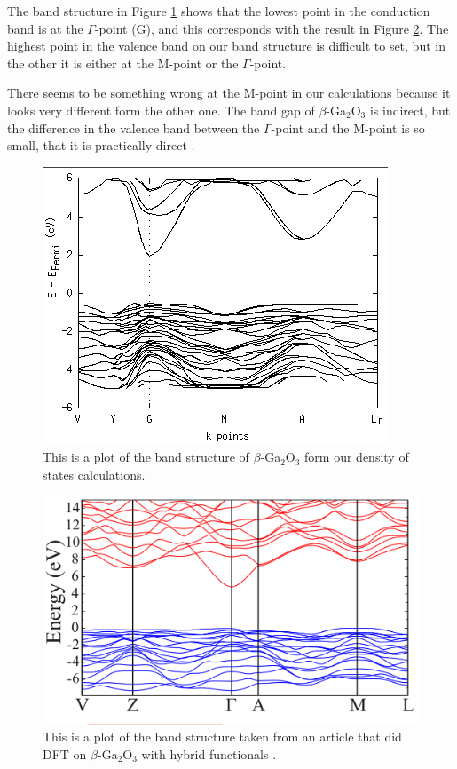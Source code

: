 The band structure in Figure \ref{fig:bandstructure_primitive} shows that the lowest point in the conduction band is at the $\Gamma$-point (G), and this corresponds with the result in Figure \ref{fig:bandstructure_fasit}. The highest point in the valence band on our band structure is difficult to set, but in the other it is either at the M-point or the $\Gamma$-point.

There seems to be something wrong at the M-point in our calculations because it looks very different form the other one. The band gap of $\beta$-Ga$_2$O$_3$ is indirect, but the difference in the valence band between the $\Gamma$-point and the M-point is so small, that it is practically direct \cite{dft_ga2o3}.

\begin{figure}[H]
\includegraphics[width=\linewidth]{../fig/primitive/bandstructure}\caption{This is a plot of the band structure of $\beta$-Ga$_2$O$_3$ form our density of states calculations.}\label{fig:bandstructure_primitive}
\end{figure}

\begin{figure}[H]
\includegraphics[width=\linewidth]{../fig/band_structure}\caption{This is a plot of the band structure taken from an article that did DFT on $\beta$-Ga$_2$O$_3$ with hybrid functionals \cite{dft_ga2o3}.}\label{fig:bandstructure_fasit}
\end{figure}



